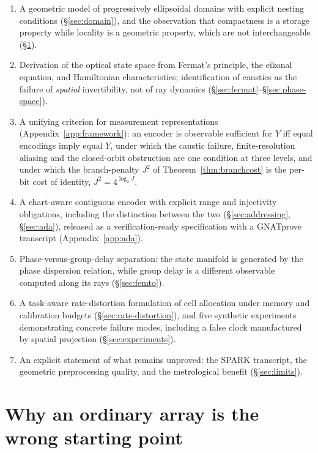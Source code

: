 \documentclass[11pt]{article}
\begin{document}
\begin{enumerate}[label=(\roman*)]
\item A geometric model of progressively ellipsoidal domains with explicit nesting
conditions (\S\ref{sec:domain}), and the observation that compactness is a storage
property while locality is a geometric property, which are not interchangeable
(\S\ref{sec:arrays}).
\item Derivation of the optical state space from Fermat's principle, the eikonal
equation, and Hamiltonian characteristics; identification of caustics as the failure of
\emph{spatial} invertibility, not of ray dynamics (\S\ref{sec:fermat}--\S\ref{sec:phase-space}).
\item A unifying criterion for measurement representations (Appendix~\ref{app:framework}):
  an encoder is observable sufficient for $Y$ iff equal encodings imply equal $Y$, under
  which the caustic failure, finite-resolution aliasing and the closed-orbit obstruction
  are one condition at three levels, and under which the branch-penalty $J^{2}$ of
  Theorem~\ref{thm:branchcost} is the per-bit cost of identity, $J^{2}=4^{\log_2 J}$.
\item A chart-aware contiguous encoder with explicit range and injectivity obligations,
including the distinction between the two (\S\ref{sec:addressing}, \S\ref{sec:ada}),
released as a verification-ready specification with a GNATprove transcript
(Appendix~\ref{app:ada}).
\item Phase-versus-group-delay separation: the state manifold is generated by the phase
dispersion relation, while group delay is a different observable computed along its
rays (\S\ref{sec:femto}).
\item A task-aware rate-distortion formulation of cell allocation under memory and
calibration budgets (\S\ref{sec:rate-distortion}), and five synthetic experiments
demonstrating concrete failure modes, including a false clock manufactured by spatial
projection (\S\ref{sec:experiments}).
\item An explicit statement of what remains unproved: the SPARK transcript, the
geometric preprocessing quality, and the metrological benefit
(\S\ref{sec:limits}).
\end{enumerate}

\section{Why an ordinary array is the wrong starting point}\label{sec:arrays}
\end{document}
